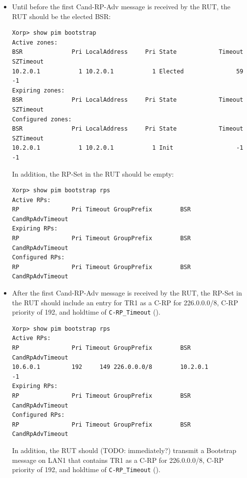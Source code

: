 \documentclass[11pt]{report}
\begin{document}

\begin{itemize}

  \item Until before the first Cand-RP-Adv message is received by the RUT, the
  RUT should be the elected BSR:

\begin{verbatim}
Xorp> show pim bootstrap 
Active zones:
BSR              Pri LocalAddress     Pri State            Timeout SZTimeout
10.2.0.1           1 10.2.0.1           1 Elected               59        -1
Expiring zones:
BSR              Pri LocalAddress     Pri State            Timeout SZTimeout
Configured zones:
BSR              Pri LocalAddress     Pri State            Timeout SZTimeout
10.2.0.1           1 10.2.0.1           1 Init                  -1        -1
\end{verbatim}

  In addition, the RP-Set in the RUT should be empty:

\begin{verbatim}
Xorp> show pim bootstrap rps 
Active RPs:
RP               Pri Timeout GroupPrefix        BSR         CandRpAdvTimeout
Expiring RPs:
RP               Pri Timeout GroupPrefix        BSR         CandRpAdvTimeout
Configured RPs:
RP               Pri Timeout GroupPrefix        BSR         CandRpAdvTimeout
\end{verbatim}

  \item After the first Cand-RP-Adv message is received by the RUT, the RP-Set
  in the RUT should include an entry for TR1 as a C-RP for 226.0.0.0/8,
  C-RP priority of 192, and holdtime of \verb=C-RP_Timeout=
  ({\PimsmCRPTimeout}).

\begin{verbatim}
Xorp> show pim bootstrap rps 
Active RPs:
RP               Pri Timeout GroupPrefix        BSR         CandRpAdvTimeout
10.6.0.1         192     149 226.0.0.0/8        10.2.0.1                  -1
Expiring RPs:
RP               Pri Timeout GroupPrefix        BSR         CandRpAdvTimeout
Configured RPs:
RP               Pri Timeout GroupPrefix        BSR         CandRpAdvTimeout
\end{verbatim}

  In addition, the RUT should (TODO: immediately?) transmit a Bootstrap
  message on LAN1 that contains TR1 as a C-RP for 226.0.0.0/8,
  C-RP priority of 192, and holdtime of \verb=C-RP_Timeout=
  ({\PimsmCRPTimeout}).


\end{itemize}
\end{document}
